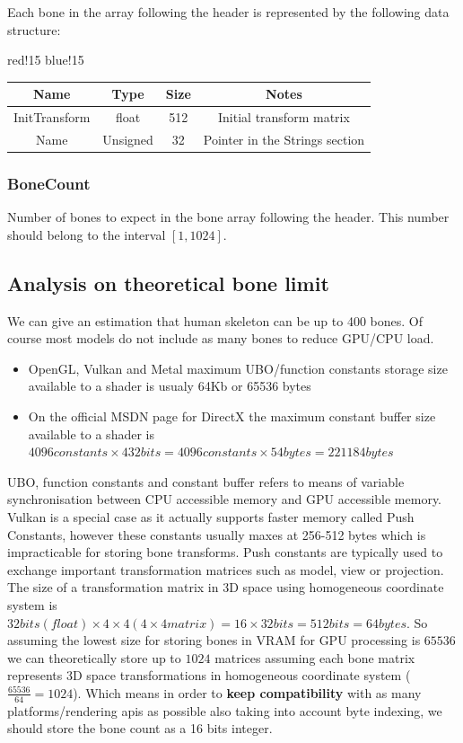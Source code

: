 Each bone in the array following the header is represented by the following data structure:
\begin{center}
    {
        {red!15}
        {blue!15}
        \begin{tabular}{|c|c|c|c|}
            \hline
            \textbf{Name} & \textbf{Type} & \textbf{Size} & \textbf{Notes} \\
    
            \hline\hline
            InitTransform & float & 512 & Initial transform matrix \\
            Name & Unsigned & 32 & Pointer in the Strings section \\
            \hline
        \end{tabular}
    }
\end{center}

\subsubsection{BoneCount}
Number of bones to expect in the bone array following the header. This number should belong to the interval $[1, 1024]$.

\subsection{Analysis on theoretical bone limit}
We can give an estimation that human skeleton can be up to 400 bones. Of course most models do not include as many bones to reduce GPU/CPU load.
\begin{itemize}
    \item OpenGL, Vulkan and Metal maximum UBO/function constants storage size available to a shader is usualy 64Kb or 65536 bytes
    \item On the official MSDN page \cite{MSDNConstantBuffers} for DirectX the maximum constant buffer size available to a shader is $4096 constants \times 432 bits = 4096 constants \times 54 bytes = 221184 bytes$
\end{itemize}
UBO, function constants and constant buffer refers to means of variable synchronisation between CPU accessible memory and GPU accessible memory. Vulkan is a special case as it actually supports faster memory called Push Constants, however these constants usually maxes at 256-512 bytes which is impracticable for storing bone transforms. Push constants are typically used to exchange important transformation matrices such as model, view or projection.
The size of a transformation matrix in 3D space using homogeneous coordinate system \cite{HomogeneousCoordinates} is $32 bits (float) \times 4 \times 4 (4\times4 matrix) = 16 \times 32 bits = 512 bits = 64 bytes$.\newline
So assuming the lowest size for storing bones in VRAM for GPU processing is $65536$ we can theoretically store up to $1024$ matrices assuming each bone matrix represents 3D space transformations in homogeneous coordinate system ($\frac{65536}{64} = 1024$).\newline
Which means in order to \textbf{keep compatibility} with as many platforms/rendering apis as possible also taking into account byte indexing, we should store the bone count as a 16 bits integer.

